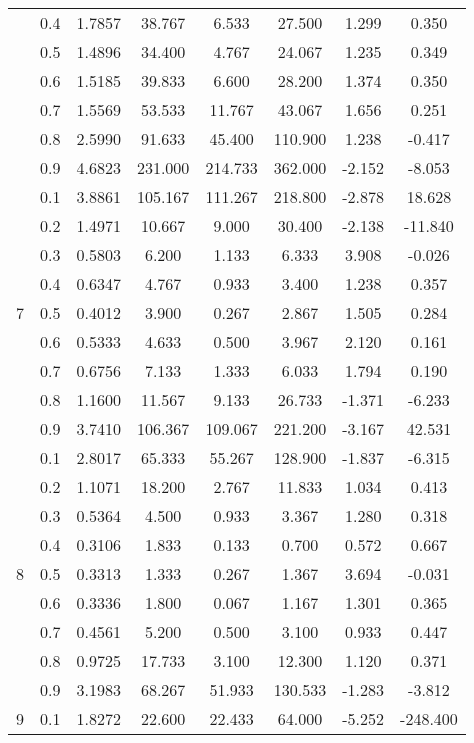 \documentclass[11pt,a4paper]{report}
\begin{document}
\begin{longtable}{ | c | c || c | c | c | c | c | c | }
 & 0.4 & 1.7857 & 38.767 & 6.533 & 27.500 & 1.299 & 0.350 \\
 & 0.5 & 1.4896 & 34.400 & 4.767 & 24.067 & 1.235 & 0.349 \\
 & 0.6 & 1.5185 & 39.833 & 6.600 & 28.200 & 1.374 & 0.350 \\
 & 0.7 & 1.5569 & 53.533 & 11.767 & 43.067 & 1.656 & 0.251 \\
 & 0.8 & 2.5990 & 91.633 & 45.400 & 110.900 & 1.238 & -0.417 \\
 & 0.9 & 4.6823 & 231.000 & 214.733 & 362.000 & -2.152 & -8.053 \\
 \hline
\multirow{9}{*}{7} & 0.1 & 3.8861 & 105.167 & 111.267 & 218.800 & -2.878 & 18.628 \\
 & 0.2 & 1.4971 & 10.667 & 9.000 & 30.400 & -2.138 & -11.840 \\
 & 0.3 & 0.5803 & 6.200 & 1.133 & 6.333 & 3.908 & -0.026 \\
 & 0.4 & 0.6347 & 4.767 & 0.933 & 3.400 & 1.238 & 0.357 \\
 & 0.5 & 0.4012 & 3.900 & 0.267 & 2.867 & 1.505 & 0.284 \\
 & 0.6 & 0.5333 & 4.633 & 0.500 & 3.967 & 2.120 & 0.161 \\
 & 0.7 & 0.6756 & 7.133 & 1.333 & 6.033 & 1.794 & 0.190 \\
 & 0.8 & 1.1600 & 11.567 & 9.133 & 26.733 & -1.371 & -6.233 \\
 & 0.9 & 3.7410 & 106.367 & 109.067 & 221.200 & -3.167 & 42.531 \\
 \hline
\multirow{9}{*}{8} & 0.1 & 2.8017 & 65.333 & 55.267 & 128.900 & -1.837 & -6.315 \\
 & 0.2 & 1.1071 & 18.200 & 2.767 & 11.833 & 1.034 & 0.413 \\
 & 0.3 & 0.5364 & 4.500 & 0.933 & 3.367 & 1.280 & 0.318 \\
 & 0.4 & 0.3106 & 1.833 & 0.133 & 0.700 & 0.572 & 0.667 \\
 & 0.5 & 0.3313 & 1.333 & 0.267 & 1.367 & 3.694 & -0.031 \\
 & 0.6 & 0.3336 & 1.800 & 0.067 & 1.167 & 1.301 & 0.365 \\
 & 0.7 & 0.4561 & 5.200 & 0.500 & 3.100 & 0.933 & 0.447 \\
 & 0.8 & 0.9725 & 17.733 & 3.100 & 12.300 & 1.120 & 0.371 \\
 & 0.9 & 3.1983 & 68.267 & 51.933 & 130.533 & -1.283 & -3.812 \\
 \hline
\multirow{9}{*}{9} & 0.1 & 1.8272 & 22.600 & 22.433 & 64.000 & -5.252 & -248.400 \\

\end{longtable}
\end{document}
